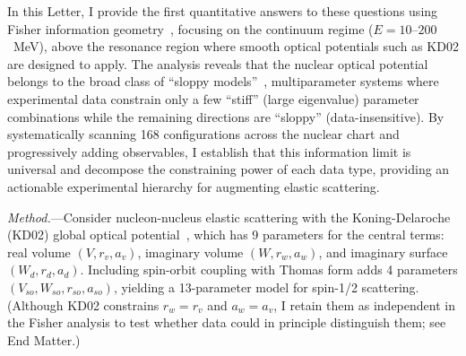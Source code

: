 \documentclass[aps,prl,reprint,superscriptaddress,showpacs]{revtex4-2}
\begin{document}
In this Letter, I provide the first quantitative answers to these questions using Fisher information geometry~\cite{Fisher1925}, focusing on the continuum regime ($E = 10$--$200$~MeV), above the resonance region where smooth optical potentials such as KD02 are designed to apply. The analysis reveals that the nuclear optical potential belongs to the broad class of ``sloppy models''~\cite{Waterfall2006PRL,Gutenkunst2007,Machta2013,Transtrum2015,Niksic2016}, multiparameter systems where experimental data constrain only a few ``stiff'' (large eigenvalue) parameter combinations while the remaining directions are ``sloppy'' (data-insensitive). By systematically scanning 168 configurations across the nuclear chart and progressively adding observables, I establish that this information limit is universal and decompose the constraining power of each data type, providing an actionable experimental hierarchy for augmenting elastic scattering.

\textit{Method.}---Consider nucleon-nucleus elastic scattering with the Koning-Delaroche (KD02) global optical potential~\cite{Becchetti1969,Varner1991,Koning2003}, which has 9 parameters for the central terms: real volume $(V, r_v, a_v)$, imaginary volume $(W, r_w, a_w)$, and imaginary surface $(W_d, r_d, a_d)$. Including spin-orbit coupling with Thomas form adds 4 parameters $(V_{so}, W_{so}, r_{so}, a_{so})$, yielding a 13-parameter model for spin-1/2 scattering. (Although KD02 constrains $r_w = r_v$ and $a_w = a_v$, I retain them as independent in the Fisher analysis to test whether data could in principle distinguish them; see End Matter.)
\end{document}
